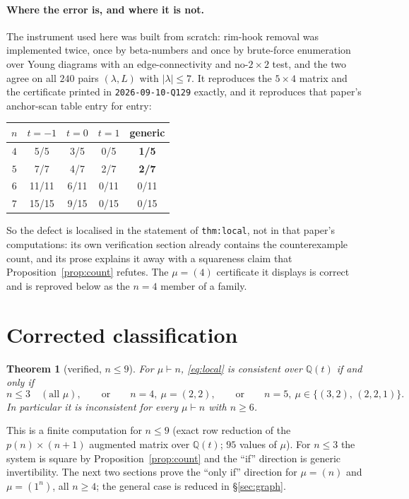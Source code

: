 \documentclass[11pt]{article}
\newtheorem{theorem}{Theorem}[section]
\theoremstyle{definition}
\newcommand{\Q}{\mathbb{Q}}
\begin{document}
\paragraph{Where the error is, and where it is not.}
The instrument used here was built from scratch: rim-hook removal was implemented twice,
once by beta-numbers and once by brute-force enumeration over Young diagrams with an
edge-connectivity and no-$2\times2$ test, and the two agree on all $240$ pairs
$(\lambda,L)$ with $|\lambda|\le7$. It reproduces the $5\times4$ matrix and the certificate
printed in \texttt{2026-09-10-Q129} exactly, and it reproduces that paper's anchor-scan table
entry for entry:
\begin{center}
\begin{tabular}{c|cccc}
 $n$ & $t=-1$ & $t=0$ & $t=1$ & generic\\\hline
 $4$ & 5/5 & 3/5 & 0/5 & \textbf{1/5}\\
 $5$ & 7/7 & 4/7 & 2/7 & \textbf{2/7}\\
 $6$ & 11/11 & 6/11 & 0/11 & 0/11\\
 $7$ & 15/15 & 9/15 & 0/15 & 0/15
\end{tabular}
\end{center}
So the defect is localised in the statement of \texttt{thm:local}, not in that paper's
computations: its own verification section already contains the counterexample count, and its
prose explains it away with a squareness claim that Proposition~\ref{prop:count} refutes.
The $\mu=(4)$ certificate it displays is correct and is reproved below as the $n=4$ member of
a family.

\section{Corrected classification}

\begin{theorem}[verified, $n\le9$]\label{thm:class}
For $\mu\vdash n$, \eqref{eq:local} is consistent over $\Q(t)$ if and only if
\[
 n\le3\quad(\text{all }\mu),\qquad\text{or}\qquad n=4,\ \mu=(2,2),\qquad\text{or}\qquad
 n=5,\ \mu\in\{(3,2),\,(2,2,1)\}.
\]
In particular it is inconsistent for every $\mu\vdash n$ with $n\ge6$.
\end{theorem}

This is a finite computation for $n\le9$ (exact row reduction of the $p(n)\times(n+1)$
augmented matrix over $\Q(t)$; $95$ values of $\mu$). For $n\le3$ the system is square by
Proposition~\ref{prop:count} and the ``if'' direction is generic invertibility. The next two
sections prove the ``only if'' direction for $\mu=(n)$ and $\mu=(1^n)$, all $n\ge4$; the
general case is reduced in \S\ref{sec:graph}.
\end{document}
